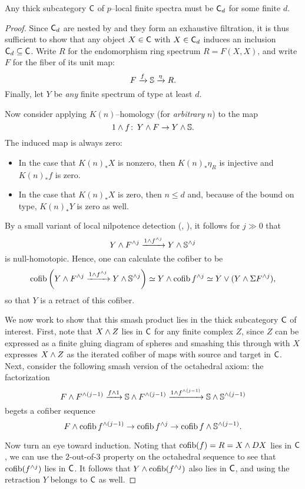 \begin{theorem}
Any thick subcategory $\CatOf C$ of $p$--local finite spectra must be $\CatOf C_d$ for some finite $d$.
\end{theorem}
\begin{proof}
Since $\CatOf C_d$ are nested by  and they form an exhaustive filtration, it is thus sufficient to show that any object $X \in \CatOf C$ with $X \in \CatOf C_d$ induces an inclusion $\CatOf C_d \subseteq \CatOf C$.  Write $R$ for the endomorphism ring spectrum $R = F(X, X)$, and write $F$ for the fiber of its unit map: \[F \xrightarrow{f} \S \xrightarrow{\eta} R.\]  Finally, let $Y$ be \emph{any} finite spectrum of type at least $d$.

Now consider applying $K(n)$--homology (for \emph{arbitrary} $n$) to the map \[1 \sm f\co Y \sm F \to Y \sm \S.\]  The induced map is always zero:
\begin{itemize}
\item In the case that $K(n)_* X$ is nonzero, then $K(n)_* \eta_R$ is injective and $K(n)_* f$ is zero.
\item In the case that $K(n)_* X$ is zero, then $n \le d$ and, because of the bound on type, $K(n)_* Y$ is zero as well.
\end{itemize}
By a small variant of local nilpotence detection (, \cite[Corollary 2.5]{HopkinsSmith}), it follows for $j \gg 0$ that \[Y \sm F^{\sm j} \xrightarrow{1 \sm f^{\sm j}} Y \sm \S^{\sm j}\] is null-homotopic.  Hence, one can calculate the cofiber to be \[\operatorname{cofib}\left( Y \sm F^{\sm j} \xrightarrow{1 \sm f^{\sm j}} Y \sm \S^{\sm j} \right) \simeq Y \sm \operatorname{cofib} f^{\sm j} \simeq Y \vee (Y \sm \Susp F^{\sm j}),\] so that $Y$ is a retract of this cofiber.

We now work to show that this smash product lies in the thick subcategory $\CatOf C$ of interest.  First, note that $X \sm Z$ lies in $\CatOf C$ for any finite complex $Z$, since $Z$ can be expressed as a finite gluing diagram of spheres and smashing this through with $X$ expresses $X \sm Z$ as the iterated cofiber of maps with source and target in $\CatOf C$.  Next, consider the following smash version of the octahedral axiom: the factorization \[F \sm F^{\sm (j-1)} \xrightarrow{f \sm 1} \S \sm F^{\sm (j-1)} \xrightarrow{1 \sm f^{\sm (j-1)}} \S \sm \S^{\sm (j-1)}\] begets a cofiber sequence \[F \sm \operatorname{cofib} f^{\sm (j-1)} \to \operatorname{cofib} f^{\sm j} \to \operatorname{cofib} f \sm \S^{\sm (j-1)}.\]

Now turn an eye toward induction.  Noting that $\operatorname{cofib}(f) = R = X \sm DX$ lies in $\CatOf C$, we can use the $2$-out-of-$3$ property on the octahedral sequence to see that $\operatorname{cofib}(f^{\sm j})$ lies in $\CatOf C$.  It follows that $Y \sm \operatorname{cofib}(f^{\sm j})$ also lies in $\CatOf C$, and using the retraction $Y$ belongs to $\CatOf C$ as well.
\end{proof}


